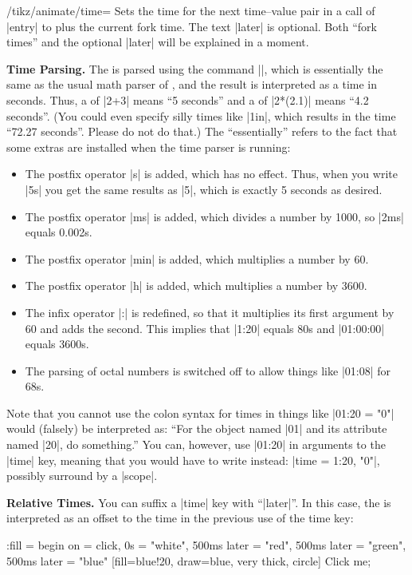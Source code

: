 \begin{key}{/tikz/animate/time=}
    Sets the time for the next time--value pair in a call of |entry| to
     plus the current fork time. The text |later| is optional. Both
    ``fork times'' and the optional |later| will be explained in a moment.

    \medskip\textbf{Time Parsing.}
    The  is parsed using the command |\pgfparsetime|, which is
    essentially the same as the usual math parser of \tikzname, and the result
    is interpreted as a time in seconds. Thus, a  of |2+3| means ``5
    seconds'' and a  of |2*(2.1)| means ``4.2 seconds''. (You could
    even specify silly times like |1in|, which results in the time ``72.27
    seconds''. Please do not do that.) The ``essentially''  refers to the fact
    that some extras are installed when the time parser is running:
    \begin{itemize}
        \item The postfix operator |s| is added, which has no effect. Thus,
            when you write |5s| you get the same results as |5|, which is
            exactly 5 seconds as desired.
        \item The postfix operator |ms| is added, which divides a number by
            1000, so |2ms| equals 0.002s.
        \item The postfix operator |min| is added, which multiplies a number by
            60.
        \item The postfix operator |h| is added, which multiplies a number by
            3600.
        \item The infix operator |:| is redefined, so that it multiplies its
            first argument by 60 and adds the second. This implies that |1:20|
            equals 80s and |01:00:00| equals 3600s.
        \item The parsing of octal numbers is switched off to allow things like
            |01:08| for 68s.
    \end{itemize}

    Note that you cannot use the colon syntax for times in things like
    |01:20 = "0"| would (falsely) be interpreted as: ``For the object named |01|
    and its attribute named |20|, do something.'' You can, however, use |01:20|
    in arguments to the |time| key, meaning that you would have to write
    instead: |time = 1:20, "0"|, possibly surround by a |scope|.

    \medskip\textbf{Relative Times.}
    You can suffix a |time| key with ``|later|''. In this case, the 
    is interpreted as an offset to the time in the previous use of the time
    key:
\begin{codeexample}[
    preamble={\usetikzlibrary{animations}},
    animation list={0.5,1,1.5,2},
]
\tikz \node :fill = { begin on = click,
    0s = "white",
    500ms later = "red",
    500ms later = "green",  %
    500ms later = "blue"} %
  [fill=blue!20, draw=blue, very thick, circle] {Click me};
\end{codeexample}


\end{key}

